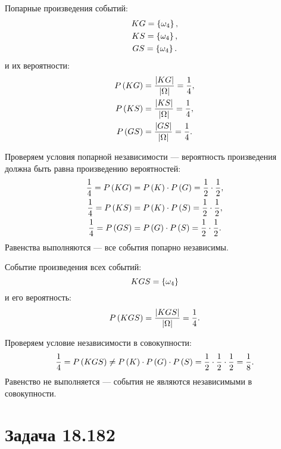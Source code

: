Попарные произведения событий:
\begin{gather}
    KG = \left \{ \omega_4 \right \} , \\
    KS = \left \{ \omega_4 \right \} , \\
    GS = \left \{ \omega_4 \right \} .
\end{gather}
и их вероятности:
\begin{gather}
    P \left ( KG \right ) = \frac{\left | KG \right |}{\left | \Omega \right |} = \frac{1}{4} , \\
    P \left ( KS \right ) = \frac{\left | KS \right |}{\left | \Omega \right |} = \frac{1}{4} , \\
    P \left ( GS \right ) = \frac{\left | GS \right |}{\left | \Omega \right |} = \frac{1}{4} .
\end{gather}

Проверяем условия попарной независимости --- вероятность произведения должна быть равна произведению вероятностей:
\begin{gather}
    \frac{1}{4} = P \left ( KG \right ) = P \left ( K \right ) \cdot P \left ( G \right ) = \frac{1}{2} \cdot \frac{1}{2} , \\
    \frac{1}{4} = P \left ( KS \right ) = P \left ( K \right ) \cdot P \left ( S \right ) = \frac{1}{2} \cdot \frac{1}{2} , \\
    \frac{1}{4} = P \left ( GS \right ) = P \left ( G \right ) \cdot P \left ( S \right ) = \frac{1}{2} \cdot \frac{1}{2} .
\end{gather}
Равенства выполняются --- все события попарно независимы.

Событие произведения всех событий:
\begin{equation}
    KGS = \left \{ \omega_4 \right \}
\end{equation}
и его вероятность:
\begin{equation}
    P \left ( KGS \right ) = \frac{\left | KGS \right |}{\left | \Omega \right |} = \frac{1}{4} .
\end{equation}

Проверяем условие независимости в совокупности:
\begin{equation}
    \frac{1}{4} = P \left ( KGS \right ) \neq P \left ( K \right ) \cdot P \left ( G \right ) \cdot P \left ( S \right ) = \frac{1}{2} \cdot \frac{1}{2} \cdot \frac{1}{2} = \frac{1}{8} .
\end{equation}
Равенство не выполняется --- события не являются независимыми в совокупности.

\section*{Задача 18.182}


